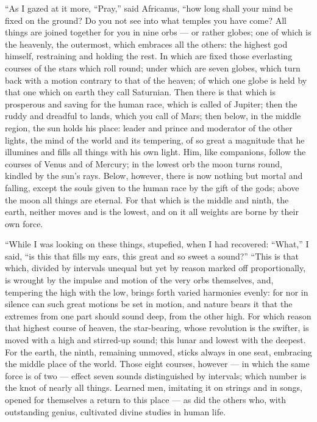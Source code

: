  ``As I gazed at it more, ``Pray,'' said Africanus, ``how long shall your mind be fixed on the ground? Do you not see into what temples you have come? All things are joined together for you in nine orbs --- or rather globes; one of which is the heavenly, the outermost, which embraces all the others: the highest god himself, restraining and holding the rest. In which are fixed those everlasting courses of the stars which roll round; under which are seven globes, which turn back with a motion contrary to that of the heaven; of which one globe is held by that one which on earth they call Saturnian. Then there is that which is prosperous and saving for the human race, which is called of Jupiter; then the ruddy and dreadful to lands, which you call of Mars; then below, in the middle region, the sun holds his place: leader and prince and moderator of the other lights, the mind of the world and its tempering, of so great a magnitude that he illumines and fills all things with his own light. Him, like companions, follow the courses of Venus and of Mercury; in the lowest orb the moon turns round, kindled by the sun's rays. Below, however, there is now nothing but mortal and falling, except the souls given to the human race by the gift of the gods; above the moon all things are eternal. For that which is the middle and ninth, the earth, neither moves and is the lowest, and on it all weights are borne by their own force.

 ``While I was looking on these things, stupefied, when I had recovered: ``What,'' I said, ``is this that fills my ears, this great and so sweet a sound?'' ``This is that which, divided by intervals unequal but yet by reason marked off proportionally, is wrought by the impulse and motion of the very orbs themselves, and, tempering the high with the low, brings forth varied harmonies evenly: for nor in silence can such great motions be set in motion, and nature bears it that the extremes from one part should sound deep, from the other high. For which reason that highest course of heaven, the star-bearing, whose revolution is the swifter, is moved with a high and stirred-up sound; this lunar and lowest with the deepest. For the earth, the ninth, remaining unmoved, sticks always in one seat, embracing the middle place of the world. Those eight courses, however --- in which the same force is of two --- effect seven sounds distinguished by intervals; which number is the knot of nearly all things. Learned men, imitating it on strings and in songs, opened for themselves a return to this place --- as did the others who, with outstanding genius, cultivated divine studies in human life.

